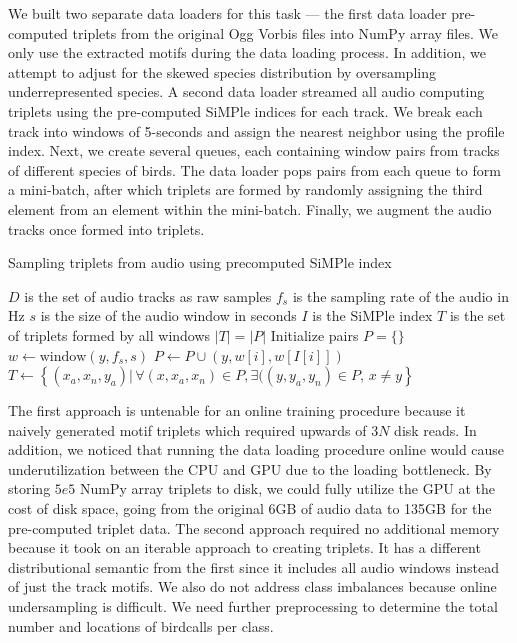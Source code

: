\documentclass[
]{ceurart}
\begin{document}
We built two separate data loaders for this task — the first data loader pre-computed triplets from the original Ogg Vorbis files into NumPy array files. We only use the extracted motifs during the data loading process. In addition, we attempt to adjust for the skewed species distribution by oversampling underrepresented species. A second data loader streamed all audio computing triplets using the pre-computed SiMPle indices for each track. We break each track into windows of 5-seconds and assign the nearest neighbor using the profile index. Next, we create several queues, each containing window pairs from tracks of different species of birds. The data loader pops pairs from each queue to form a mini-batch, after which triplets are formed by randomly assigning the third element from an element within the mini-batch. Finally, we augment the audio tracks once formed into triplets.

\begin{algorithm}
    \caption{Sampling triplets from audio using precomputed SiMPle index}
    \begin{algorithmic}
        \Require $D$ is the set of audio tracks as raw samples
        \Require $f_s$ is the sampling rate of the audio in Hz
        \Require $s$ is the size of the audio window in seconds
        \Require $I$ is the SiMPle index
        \Ensure $T$ is the set of triplets formed by all windows
        \Ensure $|T| = |P|$
        \State Initialize pairs $P = \{\}$
            \State $w \gets \text{window}(y, f_s, s)$
                \State $P \gets P \cup (y, w[i], w[I[i]])$
            \EndFor
        \EndFor
        \State $T \gets \left\{
            (x_a, x_n, y_a) |
                \,
                \forall (x, x_a, x_n) \in P,
                \exists((y, y_a, y_n) \in P
                ,
                \, x \neq y
        \right\}$
    \end{algorithmic}
\end{algorithm}


The first approach is untenable for an online training procedure because it naively generated motif triplets which required upwards of $3N$ disk reads. In addition, we noticed that running the data loading procedure online would cause underutilization between the CPU and GPU due to the loading bottleneck. By storing $5e5$ NumPy array triplets to disk, we could fully utilize the GPU at the cost of disk space, going from the original 6GB of audio data to 135GB for the pre-computed triplet data. The second approach required no additional memory because it took on an iterable approach to creating triplets. It has a different distributional semantic from the first since it includes all audio windows instead of just the track motifs. We also do not address class imbalances because online undersampling is difficult. We need further preprocessing to determine the total number and locations of birdcalls per class.
\end{document}
